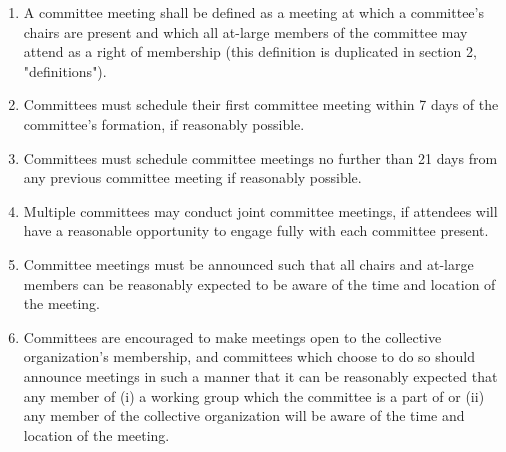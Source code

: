 \documentclass[11pt]{article}
\newcounter{h1}
\newcounter{h2}[h1]
\newcounter{h3}[h2]
\begin{document}
\begin{enumerate}
  \item A committee meeting shall be defined as a meeting at which a committee's chairs are present and which all at-large members of the committee may attend as a right of membership (this definition is duplicated in section 2, "definitions").
  \item Committees must schedule their first committee meeting within 7 days of the committee's formation, if reasonably possible.
  \item Committees must schedule committee meetings no further than 21 days from any previous committee meeting if reasonably possible.
  \item Multiple committees may conduct joint committee meetings, if attendees will have a reasonable opportunity to engage fully with each committee present.
  \item Committee meetings must be announced such that all chairs and at-large members can be reasonably expected to be aware of the time and location of the meeting.
  \item Committees are encouraged to make meetings open to the collective organization's membership, and committees which choose to do so should announce meetings in such a manner that it can be reasonably expected that any member of (i) a working group which the committee is a part of or (ii) any member of the collective organization will be aware of the time and location of the meeting.
\end{enumerate}

\end{document}
